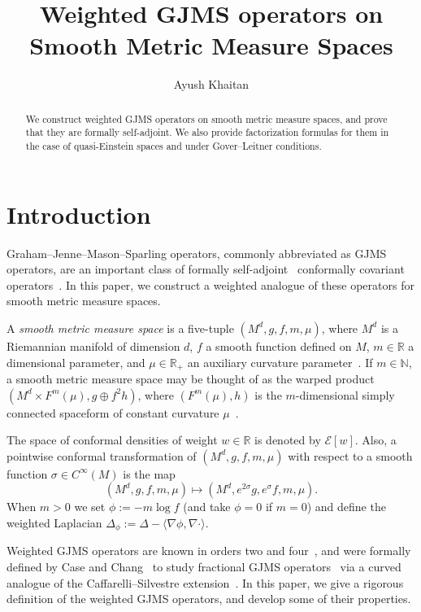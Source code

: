 \documentclass{amsart}
\title{Weighted GJMS operators on Smooth Metric Measure Spaces}
\author{Ayush Khaitan}
\begin{document}

\begin{abstract}
We construct weighted GJMS operators on smooth metric measure spaces, and prove that they are formally self-adjoint. We also provide factorization formulas for them in the case of quasi-Einstein spaces and under Gover--Leitner conditions. 
\end{abstract}

\maketitle
\section{Introduction}
Graham--Jenne--Mason--Sparling operators, commonly abbreviated as GJMS operators, are an important class of formally self-adjoint~\cites{GrahamZworski2003} conformally covariant operators~\cites{GJMS1992}. In this paper, we construct a weighted analogue of these operators for smooth metric measure spaces. 

A \emph{smooth metric measure space} is a five-tuple $(M^d,g,f,m,\mu)$, where $M^d$ is a Riemannian manifold of dimension $d$, $f$ a smooth function defined on $M$, $m\in\mathbb{R}$ a dimensional parameter, and $\mu\in\mathbb{R}_+$ an auxiliary curvature parameter~\cites{Case2014s,MR3415769}. If $m\in\mathbb{N}$, a smooth metric measure space may be thought of as the warped product $(M^d\times F^m(\mu),g\oplus f^2 h)$, where $(F^m(\mu),h)$ is the $m$-dimensional simply connected spaceform of constant curvature $\mu$~\cites{Case2014s}. 

The space of conformal densities of weight $w\in\mathbb{R}$ is denoted by $\mathcal{E}[w]$. Also, a pointwise conformal transformation of $(M^d,g,f,m,\mu)$ with respect to a smooth function $\sigma\in C^\infty(M)$ is the map $$(M^d,g,f,m,\mu)\mapsto (M^d,e^{2\sigma} g,e^\sigma f,m,\mu).$$  
{When $m>0$ we set $\phi:=-m\log f$ (and take $\phi=0$ if $m=0$) and define the weighted Laplacian $\Delta_\phi:=\Delta-\langle\nabla\phi,\nabla\cdot\rangle$.}

Weighted GJMS operators are known in orders two and four~\cites{Case2011t}, and were formally defined by Case and Chang~\cites{CaseChang2013} to study fractional GJMS operators~\cites{GrahamZworski2003} via a curved analogue of the Caffarelli--Silvestre extension~\cites{CaffarelliSilvestre2007,ChangGonzalez2011, ChangYang2017, Case2019tr}. In this paper, we give a rigorous definition of the weighted GJMS operators, and develop some of their properties.
\end{document}
